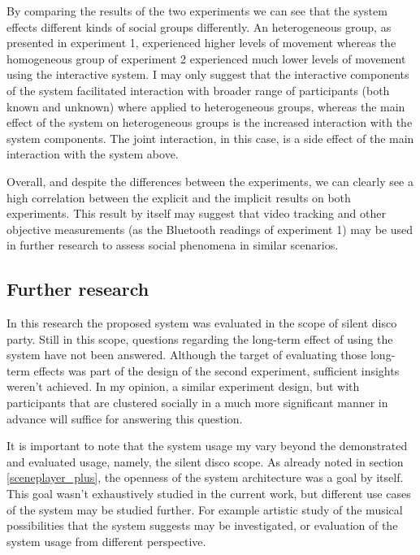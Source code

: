 \documentclass[a4paper,11pt]{article}
\begin{document}
{By comparing the results of the two experiments we can see that the system effects different kinds of social groups differently.
An heterogeneous group, as presented in experiment 1, experienced higher levels of movement whereas the homogeneous group of experiment 2 experienced much lower levels of movement using the interactive system.
I may only suggest that the interactive components of the system facilitated interaction with broader range of participants (both known and unknown) where applied to heterogeneous groups, whereas the main effect of the system on heterogeneous groups is the increased interaction with the system components.
The joint interaction, in this case, is a side effect of the main interaction with the system above.

Overall, and despite the differences between the experiments, we can clearly see a high correlation between the explicit and the implicit results on both experiments.
This result by itself may suggest that video tracking and other objective measurements (as the Bluetooth readings of experiment 1) may be used in further research to assess social phenomena in similar scenarios.

\subsection{Further research}

In this research the proposed system was evaluated in the scope of silent disco party.
Still in this scope, questions regarding the long-term effect of using the system have not been answered.
Although the target of evaluating those long-term effects was part of the design of the second experiment, sufficient insights weren't achieved.
In my opinion, a similar experiment design, but with participants that are clustered socially in a much more significant manner in advance will suffice for answering this question.

It is important to note that the system usage my vary beyond the demonstrated and evaluated usage, namely, the silent disco scope.
As already noted in section \ref{sceneplayer_plus}, the openness of the system architecture was a goal by itself.
This goal wasn't exhaustively studied in the current work, but different use cases of the system may be studied further.
For example artistic study of the musical possibilities that the system suggests may be investigated, or evaluation of the system usage from different perspective.

}
\end{document}
